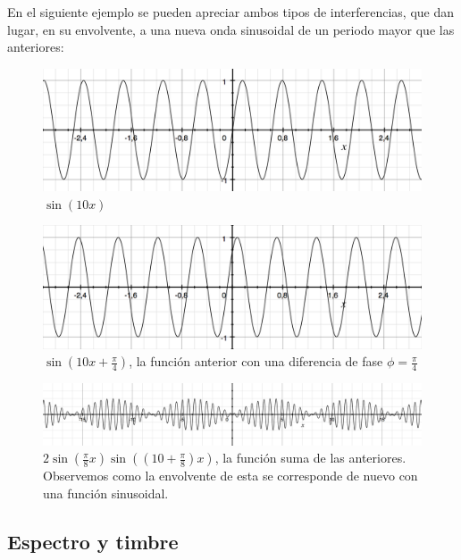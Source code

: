 \documentclass[11pt,a4paper]{article}
\begin{document}
		 En el siguiente ejemplo se pueden apreciar ambos tipos de interferencias, que dan lugar, en su envolvente, a una nueva onda sinusoidal de un periodo mayor que las anteriores:
		 
		 \begin{figure}[h]
		 	\centering
		 	\includegraphics[scale=.4]{S31}
		 	\caption{$\sin(10 x)$}
		 \end{figure}
		 
		 \begin{figure}[h]
		 	\centering
		 	\includegraphics[scale=.4]{S32}
		 	\caption{$\sin(10 x + \frac{\pi}{4})$, la función anterior con una diferencia de fase $\phi = \frac{\pi}{4}$}
		 \end{figure}
		 
		 \begin{figure}[h]
		 	\centering
		 	\includegraphics[scale=.4]{S34}
		 	\caption{$2 \sin(\frac{\pi}{8} x) \sin((10 + \frac{\pi}{8}) x)$, la función suma de las anteriores. Observemos como la envolvente de esta se corresponde de nuevo con una función sinusoidal.}
		 \end{figure}
		 
		
	\subsection{Espectro y timbre}
	
\end{document}
